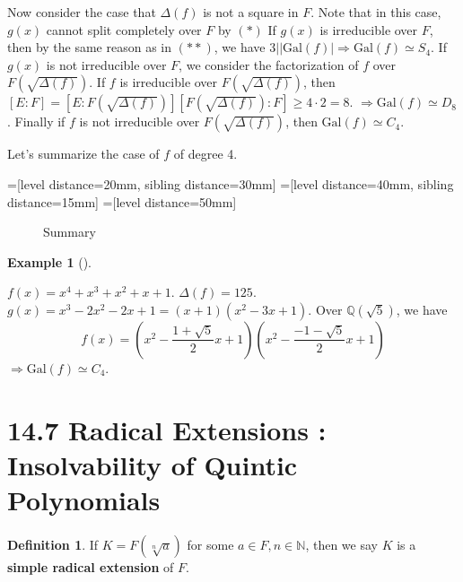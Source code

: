 \documentclass{article}
\theoremstyle{definition}
\newtheorem{ex}{Example}
\newtheorem{dfn}{Definition}
\newenvironment{exs}[1][]{%
  \begin{ex}[#1]$ $\par\nobreak\ignorespaces
}{%
  \end{ex}
}
\newcommand{\NN}{\mathbb N}
\newcommand{\QQ}{\mathbb Q}
\newcommand{\Ra}{\Rightarrow}
\newcommand{\Gal}{\text{Gal}}
\begin{document}
\par Now consider the case that $\Delta(f)$ is not a square in $F$.
Note that in this case, $g(x)$ cannot split completely over $F$ by $(*)$
If $g(x)$ is irreducible over $F$, then by the same reason as in $(**)$, we have $3 | |\Gal(f)| \Ra \Gal(f) \simeq S_4$. 
If $g(x)$ is not irreducible over $F$, we consider the factorization of $f$ over $F(\sqrt{\Delta(f)})$.
If $f$ is irreducible over $F(\sqrt{\Delta(f)})$, then $[E:F] = [E:F(\sqrt{\Delta(f)})] [F(\sqrt{\Delta(f)}):F] \geq 4 \cdot 2 = 8$. 
$\Ra \Gal(f) \simeq D_8$.
Finally if $f$ is not irreducible over $F(\sqrt{\Delta(f)})$, then $\Gal(f) \simeq C_4$.

\par Let's summarize the case of $f$ of degree 4.

=[level distance=20mm, sibling distance=30mm]
=[level distance=40mm, sibling distance=15mm]
=[level distance=50mm]
\begin{figure}[H]
	\centering
	\caption{Summary}
\end{figure}

\begin{exs}
	$f(x) = x^4 + x^3 + x^2 + x + 1$.
	$\Delta(f) = 125$.
	$g(x) = x^3 - 2 x^2 - 2x + 1 = (x + 1) (x^2 - 3x + 1)$.
	Over $\QQ(\sqrt{5})$, we have
	\[
		f(x) = \left(x^2 - \frac{1 + \sqrt{5}}{2} x + 1\right) \left( x^2 - \frac{-1 - \sqrt{5}}{2} x + 1 \right)
	\]
	$\Ra \Gal(f) \simeq C_4$.
\end{exs}

\section*{14.7 Radical Extensions : Insolvability of Quintic Polynomials}

\begin{dfn}
	If $K = F(\sqrt[n]{a})$ for some $a \in F, n \in \NN$, then we say $K$ is a \textbf{simple radical extension} of $F$.
\end{dfn}
\end{document}
